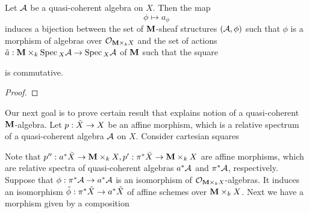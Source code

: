 \begin{theorem}
Let ${\mathcal A}$ be a quasi-coherent algebra on $X$. Then the map
$$\phi \mapsto a_{\phi}$$
induces a bijection between the set of $\mathbf{M}$-sheaf structures $({\mathcal A},\phi)$ such that $\phi$ is a morphism of algebras over ${\mathcal O}_{\mathbf{M}\times_kX}$ and the set of actions $\tilde{a}:\mathbf{M}\times_k\mathrm{Spec}\,_X{\mathcal A}\rightarrow \mathrm{Spec}\,_X{\mathcal A}$ of $\mathbf{M}$ such that the square
\begin{center}   
\end{center}
is commutative.
\end{theorem}
\begin{proof}
\end{proof}
\noindent
Our next goal is to prove certain result that explains notion of a quasi-coherent $\mathbf{M}$-algebra. Let $p:\tilde{X}\rightarrow X$ be an affine morphism, which is a relative spectrum of a quasi-coherent algebra ${\mathcal A}$ on $X$. Consider cartesian squares
\begin{center}
\end{center}
Note that $p'':a^*\tilde{X}\rightarrow \mathbf{M}\times_k X,p':\pi^*\tilde{X}\rightarrow \mathbf{M}\times_kX$ are affine morphisms, which are relative spectra of quasi-coherent algebras $a^*{\mathcal A}$ and $\pi^*{\mathcal A}$, respectively. Suppose that $\phi:\pi^*{\mathcal A}\rightarrow a^*{\mathcal A}$ is an isomorphism of ${\mathcal O}_{\mathbf{M}\times_kX}$-algebras. It induces an isomorphism $\tilde{\phi}:\pi^*\tilde{X}\rightarrow a^*\tilde{X}$ of affine schemes over $\mathbf{M}\times_kX$. Next we have a morphism given by a composition
